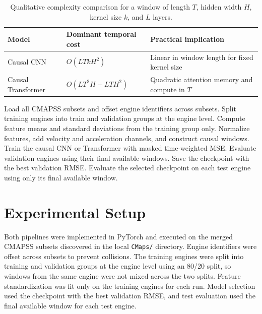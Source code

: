 \documentclass[11pt,a4paper]{article}
\begin{document}
\begin{table}[htbp]
\centering
\caption{Qualitative complexity comparison for a window of length $T$, hidden width $H$, kernel size $k$, and $L$ layers.}
\label{tab:complexity}
\begin{tabular}{lll}
\toprule
\textbf{Model} & \textbf{Dominant temporal cost} & \textbf{Practical implication} \\
\midrule
Causal CNN & $O(LT k H^2)$ & Linear in window length for fixed kernel size \\
Causal Transformer & $O(LT^2H + LTH^2)$ & Quadratic attention memory and compute in $T$ \\
\bottomrule
\end{tabular}
\end{table}

\begin{algorithm}[htbp]
\caption{Training and final-window inference protocol}
\label{alg:training}
\begin{algorithmic}[1]
\State Load all CMAPSS subsets and offset engine identifiers across subsets.
\State Split training engines into train and validation groups at the engine level.
\State Compute feature means and standard deviations from the training group only.
\State Normalize features, add velocity and acceleration channels, and construct causal windows.
    \State Train the causal CNN or Transformer with masked time-weighted MSE.
    \State Evaluate validation engines using their final available windows.
    \State Save the checkpoint with the best validation RMSE.
\EndFor
\State Evaluate the selected checkpoint on each test engine using only its final available window.
\end{algorithmic}
\end{algorithm}

\section{Experimental Setup}

Both pipelines were implemented in PyTorch and executed on the merged CMAPSS subsets discovered in the local \texttt{CMaps/} directory. Engine identifiers were offset across subsets to prevent collisions. The training engines were split into training and validation groups at the engine level using an 80/20 split, so windows from the same engine were not mixed across the two splits. Feature standardization was fit only on the training engines for each run. Model selection used the checkpoint with the best validation RMSE, and test evaluation used the final available window for each test engine.
\end{document}
